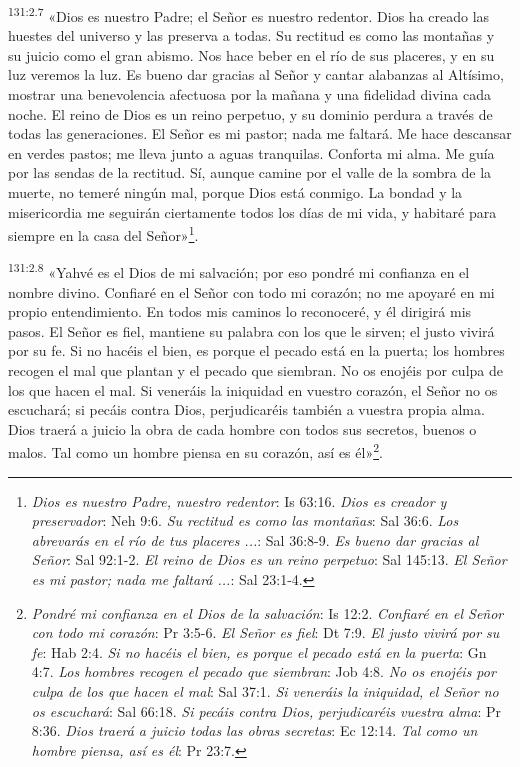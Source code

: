 \par 
\textsuperscript{131:2.7} «Dios es nuestro Padre; el Señor es nuestro redentor. Dios ha creado las huestes del universo y las preserva a todas. Su rectitud es como las montañas y su juicio como el gran abismo. Nos hace beber en el río de sus placeres, y en su luz veremos la luz. Es bueno dar gracias al Señor y cantar alabanzas al Altísimo, mostrar una benevolencia afectuosa por la mañana y una fidelidad divina cada noche. El reino de Dios es un reino perpetuo, y su dominio perdura a través de todas las generaciones. El Señor es mi pastor; nada me faltará. Me hace descansar en verdes pastos; me lleva junto a aguas tranquilas. Conforta mi alma. Me guía por las sendas de la rectitud. Sí, aunque camine por el valle de la sombra de la muerte, no temeré ningún mal, porque Dios está conmigo. La bondad y la misericordia me seguirán ciertamente todos los días de mi vida, y habitaré para siempre en la casa del Señor»\footnote{\textit{Dios es nuestro Padre, nuestro redentor}: Is 63:16. \textit{Dios es creador y preservador}: Neh 9:6. \textit{Su rectitud es como las montañas}: Sal 36:6. \textit{Los abrevarás en el río de tus placeres ...}: Sal 36:8-9. \textit{Es bueno dar gracias al Señor}: Sal 92:1-2. \textit{El reino de Dios es un reino perpetuo}: Sal 145:13. \textit{El Señor es mi pastor; nada me faltará ...}: Sal 23:1-4.}.

\par 
\textsuperscript{131:2.8} «Yahvé es el Dios de mi salvación; por eso pondré mi confianza en el nombre divino. Confiaré en el Señor con todo mi corazón; no me apoyaré en mi propio entendimiento. En todos mis caminos lo reconoceré, y él dirigirá mis pasos. El Señor es fiel, mantiene su palabra con los que le sirven; el justo vivirá por su fe. Si no hacéis el bien, es porque el pecado está en la puerta; los hombres recogen el mal que plantan y el pecado que siembran. No os enojéis por culpa de los que hacen el mal. Si veneráis la iniquidad en vuestro corazón, el Señor no os escuchará; si pecáis contra Dios, perjudicaréis también a vuestra propia alma. Dios traerá a juicio la obra de cada hombre con todos sus secretos, buenos o malos. Tal como un hombre piensa en su corazón, así es él»\footnote{\textit{Pondré mi confianza en el Dios de la salvación}: Is 12:2. \textit{Confiaré en el Señor con todo mi corazón}: Pr 3:5-6. \textit{El Señor es fiel}: Dt 7:9. \textit{El justo vivirá por su fe}: Hab 2:4. \textit{Si no hacéis el bien, es porque el pecado está en la puerta}: Gn 4:7. \textit{Los hombres recogen el pecado que siembran}: Job 4:8. \textit{No os enojéis por culpa de los que hacen el mal}: Sal 37:1. \textit{Si veneráis la iniquidad, el Señor no os escuchará}: Sal 66:18. \textit{Si pecáis contra Dios, perjudicaréis vuestra alma}: Pr 8:36. \textit{Dios traerá a juicio todas las obras secretas}: Ec 12:14. \textit{Tal como un hombre piensa, así es él}: Pr 23:7.}.

